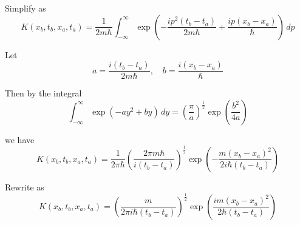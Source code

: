 Simplify as
\begin{equation*}
K(x_b,t_b,x_a,t_a)=\frac{1}{2m\hbar}\int_{-\infty}^\infty
\exp\left(-\frac{ip^2(t_b-t_a)}{2m\hbar}+\frac{ip(x_b-x_a)}{\hbar}\right)\,dp
\end{equation*}

Let
\begin{equation*}
a=\frac{i(t_b-t_a)}{2m\hbar},\quad b=\frac{i(x_b-x_a)}{\hbar}
\end{equation*}

Then by the integral
\begin{equation*}
\int_{-\infty}^\infty
\exp\left(-ay^2+by\right)\,dy=\left(\frac{\pi}{a}\right)^\frac{1}{2}\exp\left(\frac{b^2}{4a}\right)
\end{equation*}

we have
\begin{equation*}
K(x_b,t_b,x_a,t_a)=\frac{1}{2\pi\hbar}
\left(\frac{2\pi m\hbar}{i(t_b-t_a)}\right)^\frac{1}{2}
\exp\left(-\frac{m(x_b-x_a)^2}{2i\hbar(t_b-t_a)}\right)
\end{equation*}

Rewrite as
\begin{equation*}
K(x_b,t_b,x_a,t_a)=
\left(\frac{m}{2\pi i\hbar(t_b-t_a)}\right)^\frac{1}{2}
\exp\left(\frac{im(x_b-x_a)^2}{2\hbar(t_b-t_a)}\right)
\end{equation*}


